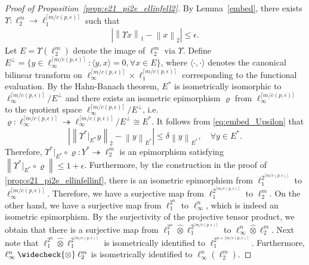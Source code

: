 \documentclass[11pt]{article}
\newcommand{\norm}[1]{\left \|#1 \right \|}
\begin{document}
\begin{proof}[Proof of Proposition~\ref{prop:e21_pi2e_ellinfell2}]
By Lemma~\ref{embed}, there exists $\Upsilon: \ell_2^m \to \ell_1^{\lceil m/c(p,\epsilon)\rceil}$ such that
\begin{align}
\label{eq:embed_Upsilon}
\left| \norm{\Upsilon x}_1 - \norm{x}_2 \right| \leq \epsilon.
\end{align}
Let $E = \Upsilon(\ell_2^m)$ denote the image of $\ell_2^m$ via $\Upsilon$. Define $E^\perp = \{y \in \ell_\infty^{\lceil m/c(p,\epsilon)\rceil} : \langle y, x \rangle = 0, \forall x \in E\}$, where $\langle \cdot, \cdot \rangle$ denotes the canonical bilinear transform on $\ell_\infty^{\lceil m/c(p,\epsilon)\rceil} \times \ell_1^{\lceil m/c(p,\epsilon)\rceil}$ corresponding to the functional evaluation. 
By the Hahn-Banach theorem, $E^*$ is isometrically isomorphic to $\ell_\infty^{\lceil m/c(p,\epsilon)\rceil}/E^\perp$ and there exists an isometric epimorphism $\varrho$ from $\ell_\infty^{\lceil m/c(p,\epsilon)\rceil}$ to the quotient space $\ell_\infty^{\lceil m/c(p,\epsilon)\rceil}/E^\perp$, i.e. $\varrho: \ell_\infty^{\lceil m/c(p,\epsilon)\rceil} \twoheadrightarrow \ell_\infty^{\lceil m/c(p,\epsilon)\rceil}/E^\perp \cong E^*$. It follows from \eqref{eq:embed_Upsilon} that 
\begin{equation*}
\left| \norm{\Upsilon^*|_{E^*} y}_2 - \norm{y}_{E^*} \right| \leq \delta \norm{y}_{E^*}, \quad \forall y \in E^*. 
\end{equation*}
Therefore, $\Upsilon^*|_{E^*} \circ \varrho: Y^* \twoheadrightarrow \ell_2^m$ is an epimorphism satisfying $\norm{\Upsilon^*|_{E^*} \circ \varrho} \leq 1+\epsilon$. 
Furthermore, by the construction in the proof of \ref{prop:e21_pi2e_ellinfellinf}, there is an isometric epimorphism from $\ell_1^{2^{\lceil m/c(p,\epsilon)\rceil}}$ to $\ell_\infty^{\lceil m/c(p,\epsilon)\rceil}$. 
Therefore, we have a surjective map from $\ell_1^{2^{\lceil m/c(p,\epsilon)\rceil}}$ to $\ell_2^m$. 
On the other hand, we have a surjective map from $\ell_1^{2^n}$ to $\ell_\infty^n$, which is indeed an isometric epimorphism. 
By the surjectivity of the projective tensor product, we obtain that there is a surjective map from $\ell_1^{2^n} \mathbin{\widehat{\otimes}} \ell_1^{2^{\lceil m/c(p,\epsilon)\rceil}}$ to $\ell_\infty^n \mathbin{\widehat{\otimes}} \ell_2^m$. 
Next note that $\ell_1^{2^n} \mathbin{\widehat{\otimes}} \ell_1^{2^{\lceil m/c(p,\epsilon)\rceil}}$ is isometrically identified to $\ell_1^{2^{n+\lceil m/c(p,\epsilon)\rceil}}$. 
Furthermore, $\ell_\infty^n \mathbin{\widecheck{\otimes}} \ell_2^m$ is isometrically identified to $\ell_\infty^n(\ell_2^m)$. 

\end{proof}
\end{document}
